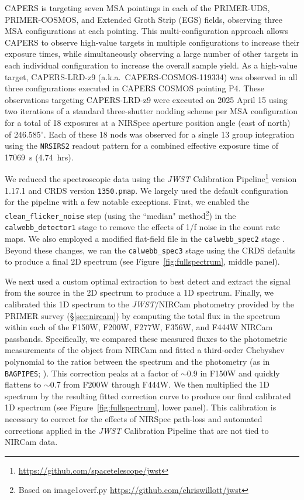 \documentclass[twocolumn]{aastex7}
\newcommand{\src}{CAPERS-LRD-z9}
\begin{document}
CAPERS is targeting seven MSA pointings in each of the PRIMER-UDS, PRIMER-COSMOS, and Extended Groth Strip (EGS) fields, observing three MSA configurations at each pointing. This multi-configuration approach allows CAPERS to observe high-value targets in multiple configurations to increase their exposure times, while simultaneously observing a large number of other targets in each individual configuration to increase the overall sample yield. As a high-value target, \src{} (a.k.a.\ CAPERS-COSMOS-119334) was observed in all three configurations executed in CAPERS COSMOS pointing P4. These observations targeting \src{} were executed on 2025 April 15 using two iterations of a standard three-shutter nodding scheme per MSA configuration for a total of 18 exposures at a NIRSpec aperture position angle (east of north) of 246.585$^{\circ}$. Each of these 18 nods was observed for a single 13 group integration using the \texttt{NRSIRS2} readout pattern for a combined effective exposure time of 17069~s (4.74~hrs). 

We reduced the spectroscopic data using the \textit{JWST} Calibration Pipeline\footnote{\url{https://github.com/spacetelescope/jwst}} \citep{bushouse23} version 1.17.1 and CRDS version \texttt{1350.pmap}. We largely used the default configuration for the pipeline with a few notable exceptions. First, we enabled the \texttt{clean\_flicker\_noise} step (using the ``median" method\footnote{Based on image1overf.py \url{https://github.com/chriswillott/jwst}}) in the \texttt{calwebb\_detector1} stage to remove the effects of 1/f noise in the count rate maps. We also employed a modified flat-field file in the \texttt{calwebb\_spec2} stage \citep[see][for details]{arrabalharo23}. Beyond these changes, we ran the \texttt{calwebb\_spec3} stage using the CRDS defaults to produce a final 2D spectrum (see Figure~\ref{fig:fullspectrum}, middle panel). 

We next used a custom optimal extraction \citep{horne86} to best detect and extract the signal from the source in the 2D spectrum to produce a 1D spectrum. Finally, we calibrated this 1D spectrum to the \textit{JWST}/NIRCam photometry provided by the PRIMER survey (\S\ref{sec:nircam}) by computing the total flux in the spectrum within each of the F150W, F200W, F277W, F356W, and F444W NIRCam passbands. Specifically, we compared these measured fluxes to the photometric measurements of the object from NIRCam and fitted a third-order Chebyshev polynomial to the ratios between the spectrum and the photometry (as in \texttt{BAGPIPES}; \citealt{carnall18}). This correction peaks at a factor of $\sim$0.9 in F150W and quickly flattens to $\sim$0.7 from F200W through F444W. We then multiplied the 1D spectrum by the resulting fitted correction curve to produce our final calibrated 1D spectrum (see Figure~\ref{fig:fullspectrum}, lower panel). This calibration is necessary to correct for the effects of NIRSpec path-loss and automated corrections applied in the \textit{JWST} Calibration Pipeline that are not tied to NIRCam data.
\end{document}
